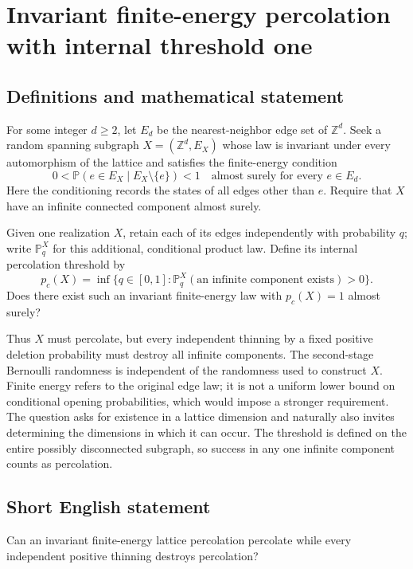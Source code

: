 \documentclass[11pt,a4paper]{article}
\begin{document}
\section*{Invariant finite-energy percolation with internal threshold one}\label{statement}

\subsection{Definitions and mathematical statement}
For some integer $d\ge2$, let $E_d$ be the nearest-neighbor edge set of $\mathbb Z^d$. Seek a random spanning subgraph $X=(\mathbb Z^d,E_X)$ whose law is invariant under every automorphism of the lattice and satisfies the finite-energy condition
\[
0<\mathbb P(e\in E_X\mid E_X\setminus\{e\})<1
\quad\text{almost surely for every }e\in E_d.
\]
Here the conditioning records the states of all edges other than $e$. Require that $X$ have an infinite connected component almost surely.

Given one realization $X$, retain each of its edges independently with probability $q$; write $\mathbb P_q^X$ for this additional, conditional product law. Define its internal percolation threshold by
\[
p_c(X)=\inf\{q\in[0,1]:\mathbb P_q^X(\text{an infinite component exists})>0\}.
\]
Does there exist such an invariant finite-energy law with $p_c(X)=1$ almost surely?

Thus $X$ must percolate, but every independent thinning by a fixed positive deletion probability must destroy all infinite components. The second-stage Bernoulli randomness is independent of the randomness used to construct $X$. Finite energy refers to the original edge law; it is not a uniform lower bound on conditional opening probabilities, which would impose a stronger requirement. The question asks for existence in a lattice dimension and naturally also invites determining the dimensions in which it can occur. The threshold is defined on the entire possibly disconnected subgraph, so success in any one infinite component counts as percolation.
\subsection{Short English statement}
Can an invariant finite-energy lattice percolation percolate while every independent positive thinning destroys percolation?
\end{document}
